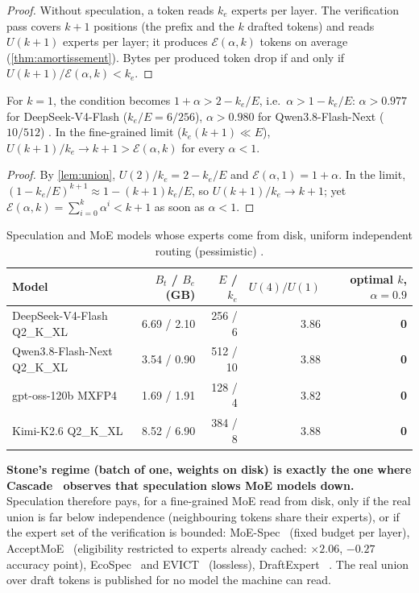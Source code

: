 \begin{proof}
Without speculation, a token reads $k_e$ experts per layer. The verification pass covers $k+1$ positions (the prefix and the $k$ drafted tokens) and reads $U(k+1)$ experts per layer; it produces $\mathcal E(\alpha,k)$ tokens on average (\cref{thm:amortissement}). Bytes per produced token drop if and only if $U(k+1)/\mathcal E(\alpha,k) < k_e$.
\end{proof}

\begin{corollaire}\label{cor:jamais}
For $k = 1$, the condition becomes $1 + \alpha > 2 - k_e/E$, i.e.\ $\alpha > 1 - k_e/E$: $\alpha > 0.977$ for DeepSeek-V4-Flash ($k_e/E = 6/256$), $\alpha > 0.980$ for Qwen3.8-Flash-Next ($10/512$) \calc. In the fine-grained limit ($k_e(k+1) \ll E$), $U(k+1)/k_e \to k+1 > \mathcal E(\alpha,k)$ for every $\alpha < 1$.
\end{corollaire}

\begin{proof}
By \cref{lem:union}, $U(2)/k_e = 2 - k_e/E$ and $\mathcal E(\alpha,1) = 1 + \alpha$. In the limit, $(1 - k_e/E)^{k+1} \approx 1 - (k+1)k_e/E$, so $U(k+1)/k_e \to k+1$; yet $\mathcal E(\alpha,k) = \sum_{i=0}^k \alpha^i < k + 1$ as soon as $\alpha < 1$.
\end{proof}

\begin{table}[ht]
\centering\small
\caption[Speculation and MoE models read from disk]{Speculation and MoE models whose experts come from disk, uniform independent routing (pessimistic) \calc.}
\label{tab:spec-moe}
\begin{tabular}{@{}lrrrr@{}}
\toprule
Model & $B_t$ / $B_e$ (GB) & $E$ / $k_e$ & $U(4)/U(1)$ & optimal $k$, $\alpha = 0.9$ \\
\midrule
DeepSeek-V4-Flash Q2\_K\_XL & 6.69 / 2.10 & 256 / 6 & 3.86 & \textbf{0} \\
Qwen3.8-Flash-Next Q2\_K\_XL & 3.54 / 0.90 & 512 / 10 & 3.88 & \textbf{0} \\
gpt-oss-120b MXFP4 & 1.69 / 1.91 & 128 / 4 & 3.82 & \textbf{0} \\
Kimi-K2.6 Q2\_K\_XL & 8.52 / 6.90 & 384 / 8 & 3.88 & \textbf{0} \\
\bottomrule
\end{tabular}
\end{table}

\textbf{Stone's regime (batch of one, weights on disk) is exactly the one where Cascade~\cite{cascade2025} observes that speculation slows MoE models down.} Speculation therefore pays, for a fine-grained MoE read from disk, only if the real union is far below independence (neighbouring tokens share their experts), or if the expert set of the verification is bounded: MoE-Spec~\cite{moespec2026} (fixed budget per layer), AcceptMoE~\cite{acceptmoe2026} (eligibility restricted to experts already cached: $\times2.06$, $-0.27$ accuracy point), EcoSpec~\cite{ecospec2026} and EVICT~\cite{evict2026} (lossless), DraftExpert~\cite{draftexpert2026} \litt. The real union over draft tokens is published for no model the machine can read.

